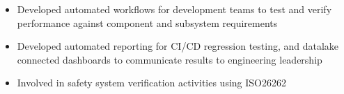 \begin{itemize} [leftmargin = \itemmargin]
	\item Developed automated workflows for development teams to test and verify performance against component and subsystem requirements
	\item Developed automated reporting for CI/CD regression testing, and datalake connected dashboards to communicate results to engineering leadership 
	\item Involved in safety system verification activities using ISO26262
	
\end{itemize} \\